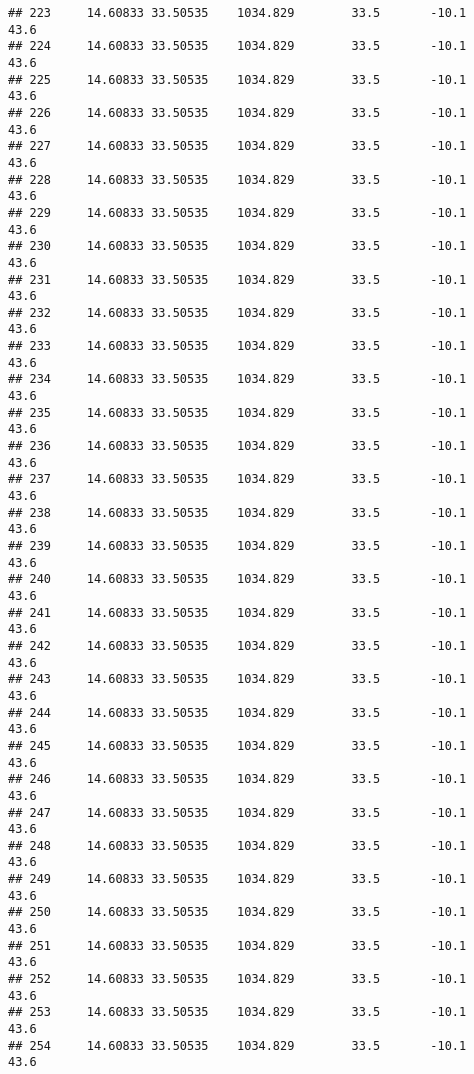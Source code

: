 \documentclass[]{article}
\begin{document}
\begin{verbatim}
## 223     14.60833 33.50535    1034.829        33.5       -10.1              43.6
## 224     14.60833 33.50535    1034.829        33.5       -10.1              43.6
## 225     14.60833 33.50535    1034.829        33.5       -10.1              43.6
## 226     14.60833 33.50535    1034.829        33.5       -10.1              43.6
## 227     14.60833 33.50535    1034.829        33.5       -10.1              43.6
## 228     14.60833 33.50535    1034.829        33.5       -10.1              43.6
## 229     14.60833 33.50535    1034.829        33.5       -10.1              43.6
## 230     14.60833 33.50535    1034.829        33.5       -10.1              43.6
## 231     14.60833 33.50535    1034.829        33.5       -10.1              43.6
## 232     14.60833 33.50535    1034.829        33.5       -10.1              43.6
## 233     14.60833 33.50535    1034.829        33.5       -10.1              43.6
## 234     14.60833 33.50535    1034.829        33.5       -10.1              43.6
## 235     14.60833 33.50535    1034.829        33.5       -10.1              43.6
## 236     14.60833 33.50535    1034.829        33.5       -10.1              43.6
## 237     14.60833 33.50535    1034.829        33.5       -10.1              43.6
## 238     14.60833 33.50535    1034.829        33.5       -10.1              43.6
## 239     14.60833 33.50535    1034.829        33.5       -10.1              43.6
## 240     14.60833 33.50535    1034.829        33.5       -10.1              43.6
## 241     14.60833 33.50535    1034.829        33.5       -10.1              43.6
## 242     14.60833 33.50535    1034.829        33.5       -10.1              43.6
## 243     14.60833 33.50535    1034.829        33.5       -10.1              43.6
## 244     14.60833 33.50535    1034.829        33.5       -10.1              43.6
## 245     14.60833 33.50535    1034.829        33.5       -10.1              43.6
## 246     14.60833 33.50535    1034.829        33.5       -10.1              43.6
## 247     14.60833 33.50535    1034.829        33.5       -10.1              43.6
## 248     14.60833 33.50535    1034.829        33.5       -10.1              43.6
## 249     14.60833 33.50535    1034.829        33.5       -10.1              43.6
## 250     14.60833 33.50535    1034.829        33.5       -10.1              43.6
## 251     14.60833 33.50535    1034.829        33.5       -10.1              43.6
## 252     14.60833 33.50535    1034.829        33.5       -10.1              43.6
## 253     14.60833 33.50535    1034.829        33.5       -10.1              43.6
## 254     14.60833 33.50535    1034.829        33.5       -10.1              43.6

\end{verbatim}
\end{document}
